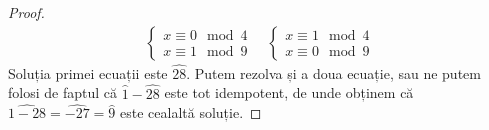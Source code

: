 \begin{exercise}[1.28]
\begin{itemize}
\begin{proof}
    \begin{gather*}
        \begin{cases}
            x \equiv 0 \mod 4 \\
            x \equiv 1 \mod 9
        \end{cases}
        \quad
        \begin{cases}
            x \equiv 1 \mod 4 \\
            x \equiv 0 \mod 9
        \end{cases}
    \end{gather*}
    Soluția primei ecuații este \(\widehat{28}\). Putem rezolva și a doua ecuație, sau ne putem folosi de faptul că \(\widehat{1} - \widehat{28}\) este tot idempotent, de unde obținem că \(\widehat{1 - 28} = \widehat{-27} = \widehat{9}\) este cealaltă soluție.
    \end{proof}
\end{itemize}
\end{exercise}

